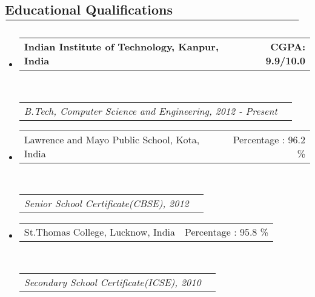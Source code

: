 \documentclass[10pt,letterpaper]{article}
\makeatletter
\newcommand{\headerrow}[2]
{\begin{tabular*}{\linewidth}{l@{\extracolsep{\fill}}r}
	#1 &
	#2 \\
\end{tabular*}}
\newcommand\tline[2]{$\underset{\text{#1}}{\text{\underline{\hspace{#2}}}}$}
\makeatother
\begin{document}
\subsection*{ Educational Qualifications \tline{}{4.8in}}
\vspace{-0.9em}
\begin{itemize}
\setlength{\itemsep}{3pt}
	\item 
	\headerrow
		{\textbf{Indian Institute of Technology, Kanpur, India}}
		{\textbf{CGPA: 9.9/10.0}}
	\\
	\headerrow
		{\emph{B.Tech, Computer Science and Engineering, 2012 - Present}}
		{}


   \item 
	\headerrow
		{{Lawrence and Mayo Public School, Kota, India}}
		{{Percentage : 96.2 \%}}
	\\
	\headerrow
		{\emph{Senior School Certificate(CBSE), 2012}}
		{}

 \item 
	\headerrow
		{{St.Thomas College, Lucknow, India}}
		{{Percentage : 95.8 \%}}
	\\
	\headerrow
		{\emph{Secondary School Certificate(ICSE), 2010}}
		{}


\end{itemize}



\vspace{-1.8em}
\end{document}
